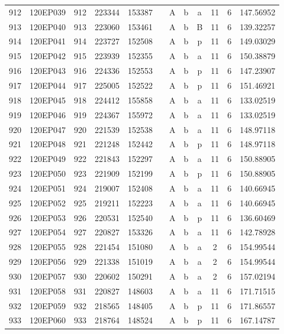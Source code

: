 \begin{tabular}{|*{12}{c|}}
912 & 120EP039 & 912 & 223344 & 153387 &  & A & b & a & 11 & 6 & 147.56952 \\ 
913 & 120EP040 & 913 & 223060 & 153461 &  & A & b & B & 11 & 6 & 139.32257 \\ 
914 & 120EP041 & 914 & 223727 & 152508 &  & A & b & p & 11 & 6 & 149.03029 \\ 
915 & 120EP042 & 915 & 223939 & 152355 &  & A & b & a & 11 & 6 & 150.38879 \\ 
916 & 120EP043 & 916 & 224336 & 152553 &  & A & b & p & 11 & 6 & 147.23907 \\ 
917 & 120EP044 & 917 & 225005 & 152522 &  & A & b & p & 11 & 6 & 151.46921 \\ 
918 & 120EP045 & 918 & 224412 & 155858 &  & A & b & a & 11 & 6 & 133.02519 \\ 
919 & 120EP046 & 919 & 224367 & 155972 &  & A & b & a & 11 & 6 & 133.02519 \\ 
920 & 120EP047 & 920 & 221539 & 152538 &  & A & b & a & 11 & 6 & 148.97118 \\ 
921 & 120EP048 & 921 & 221248 & 152442 &  & A & b & p & 11 & 6 & 148.97118 \\ 
922 & 120EP049 & 922 & 221843 & 152297 &  & A & b & a & 11 & 6 & 150.88905 \\ 
923 & 120EP050 & 923 & 221909 & 152199 &  & A & b & p & 11 & 6 & 150.88905 \\ 
924 & 120EP051 & 924 & 219007 & 152408 &  & A & b & a & 11 & 6 & 140.66945 \\ 
925 & 120EP052 & 925 & 219211 & 152223 &  & A & b & a & 11 & 6 & 140.66945 \\ 
926 & 120EP053 & 926 & 220531 & 152540 &  & A & b & p & 11 & 6 & 136.60469 \\ 
927 & 120EP054 & 927 & 220827 & 153326 &  & A & b & a & 11 & 6 & 142.78928 \\ 
928 & 120EP055 & 928 & 221454 & 151080 &  & A & b & a & 2 & 6 & 154.99544 \\ 
929 & 120EP056 & 929 & 221338 & 151019 &  & A & b & a & 2 & 6 & 154.99544 \\ 
930 & 120EP057 & 930 & 220602 & 150291 &  & A & b & a & 2 & 6 & 157.02194 \\ 
931 & 120EP058 & 931 & 220827 & 148603 &  & A & b & a & 11 & 6 & 171.71515 \\ 
932 & 120EP059 & 932 & 218565 & 148405 &  & A & b & p & 11 & 6 & 171.86557 \\ 
933 & 120EP060 & 933 & 218764 & 148524 &  & A & b & p & 11 & 6 & 167.14787 \\ 

\end{tabular}

